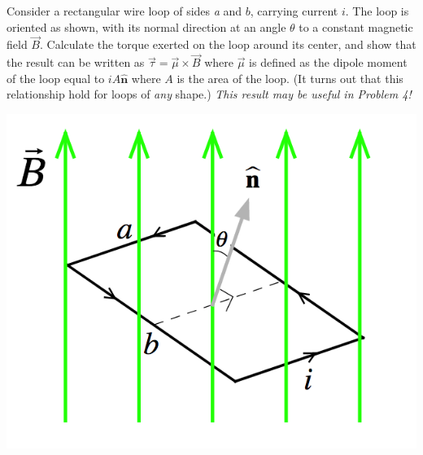\documentclass[11pt,letterpaper,boxed]{hmcpset}
\begin{document}
\begin{problem}[3. ]
Consider a rectangular wire loop of sides \textit{a} and $b$, carrying current $i$. The loop is oriented as shown, with its normal direction at an angle $\theta$ to a constant magnetic field $\vec{B}$. Calculate the torque exerted on the loop around its center, and show that the result can be written as $\vec{\tau} = \vec{\mu} \times \vec{B}$ where $\vec{\mu}$ is defined as the dipole moment of the loop equal to $iA\hat{\textbf{n}}$ where $A$ is the area of the loop. (It turns out that this relationship hold for loops of \textit{any} shape.) \textit{This result may be useful in Problem 4!}
\begin{center}
\includegraphics[scale=.6]{3.png}
\end{center}
\end{problem}

\begin{solution}
\vfill
\end{solution}
\newpage
\end{document}

